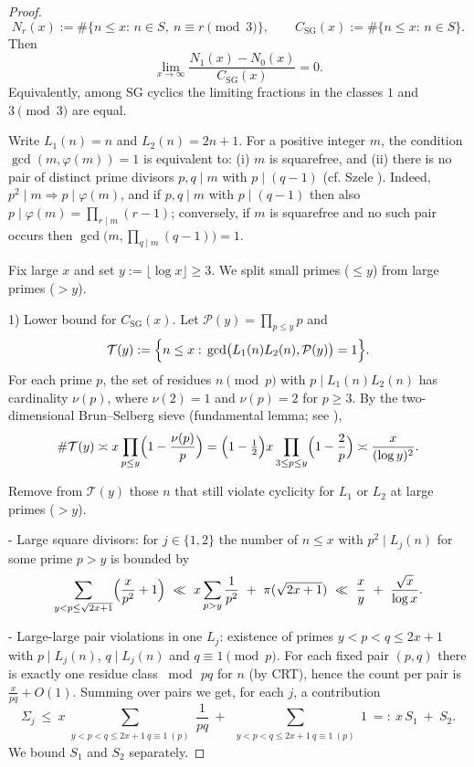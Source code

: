 \documentclass[12pt]{article}
\renewcommand{\tag}[1]{}
\theoremstyle{remark}
\begin{document}
\begin{proof}
\[N_r(x):=\#\{n\le x:\, n\in S,\ n\equiv r\pmod 3\},\qquad C_{\mathrm{SG}}(x):=\#\{n\le x:\, n\in S\}.
\]
Then
$$\lim_{x\to\infty}\frac{N_1(x)-N_0(x)}{C_{\mathrm{SG}}(x)}=0.$$
Equivalently, among SG cyclics the limiting fractions in the classes $1$ and $3\pmod3$ are equal.

Write $L_1(n)=n$ and $L_2(n)=2n+1$. For a positive integer $m$, the condition $\gcd(m,\varphi(m))=1$ is equivalent to: (i) $m$ is squarefree, and (ii) there is no pair of distinct prime divisors $p,q\mid m$ with $p\mid(q-1)$ (cf. Szele \cite{Szele1947}). Indeed, $p^2\mid m\Rightarrow p\mid\varphi(m)$, and if $p,q\mid m$ with $p\mid(q-1)$ then also $p\mid\varphi(m)=\prod_{r\mid m}(r-1)$; conversely, if $m$ is squarefree and no such pair occurs then $\gcd\bigl(m,\prod_{q\mid m}(q-1)\bigr)=1$.

Fix large $x$ and set $y:=\lfloor\log x\rfloor\ge3$. We split small primes ($\le y$) from large primes ($>y$).

1) Lower bound for $C_{\mathrm{SG}}(x)$. Let $\mathcal P(y)=\prod_{p\le y}p$ and
$$\mathcal T(y):=\Bigl\{n\le x:\, \gcd\bigl(L_1(n)L_2(n),\mathcal P(y)\bigr)=1\Bigr\}.$$
For each prime $p$, the set of residues $n\pmod p$ with $p\mid L_1(n)L_2(n)$ has cardinality $\nu(p)$, where $\nu(2)=1$ and $\nu(p)=2$ for $p\ge3$. By the two-dimensional Brun--Selberg sieve (fundamental lemma; see \cite{HalRich1974,Greaves2001,IK2004}),
$$\#\mathcal T(y)\asymp x\prod_{p\le y}\Bigl(1-\frac{\nu(p)}{p}\Bigr)=\Bigl(1-\tfrac12\Bigr)x\prod_{3\le p\le y}\Bigl(1-\frac{2}{p}\Bigr)\asymp \frac{x}{(\log y)^2}.\tag{1}$$

Remove from $\mathcal T(y)$ those $n$ that still violate cyclicity for $L_1$ or $L_2$ at large primes ($>y$).

- Large square divisors: for $j\in\{1,2\}$ the number of $n\le x$ with $p^2\mid L_j(n)$ for some prime $p>y$ is bounded by
\[\sum_{y<p\le\sqrt{2x+1}}\Bigl(\frac{x}{p^2}+1\Bigr)\ \ll\ x\sum_{p>y}\frac{1}{p^2}\ +\ \pi(\sqrt{2x+1})\ \ll\ \frac{x}{y}\ +\ \frac{\sqrt{x}}{\log x}.\tag{2}\]

- Large-large pair violations in one $L_j$: existence of primes $y<p<q\le 2x+1$ with $p\mid L_j(n)$, $q\mid L_j(n)$ and $q\equiv1\pmod p$. For each fixed pair $(p,q)$ there is exactly one residue class $\bmod\,pq$ for $n$ (by CRT), hence the count per pair is $\frac{x}{pq}+O(1)$. Summing over pairs we get, for each $j$, a contribution
\[\Sigma_j\ \le\ x\sum_{\substack{y<p<q\le 2x+1\ q\equiv1\ (p)}}\frac{1}{pq}\ +\ \sum_{\substack{y<p<q\le 2x+1\ q\equiv1\ (p)}}1\ =:\ x\,S_1\ +\ S_2.\]
We bound $S_1$ and $S_2$ separately.


\end{proof}
\end{document}
